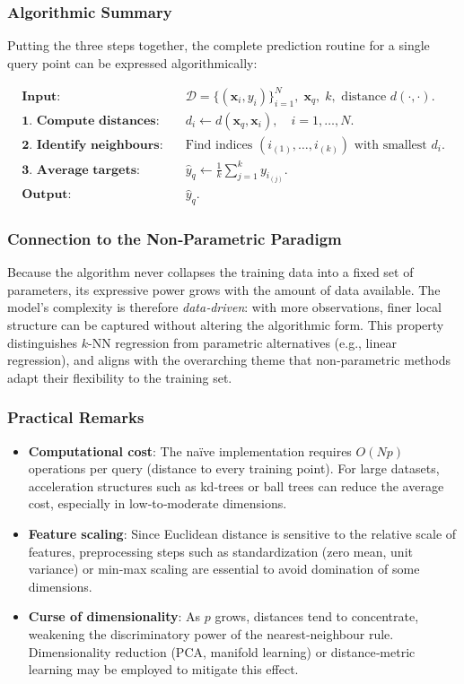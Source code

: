 \documentclass[12pt, a4paper]{article}
\begin{document}
\subsubsection{Algorithmic Summary}
Putting the three steps together, the complete prediction routine for a single query point can be expressed algorithmically:

\[
\begin{aligned}
\textbf{Input:}&\quad \mathcal{D}=\{(\mathbf{x}_i,y_i)\}_{i=1}^{N},\; \mathbf{x}_q,\; k, \text{ distance } d(\cdot,\cdot).\\
\textbf{1. Compute distances:}&\quad d_i \leftarrow d(\mathbf{x}_q,\mathbf{x}_i), \quad i=1,\dots,N.\\
\textbf{2. Identify neighbours:}&\quad \text{Find indices } (i_{(1)},\dots,i_{(k)}) \text{ with smallest } d_i.\\
\textbf{3. Average targets:}&\quad \hat{y}_q \leftarrow \frac{1}{k}\sum_{j=1}^{k} y_{i_{(j)}}.\\
\textbf{Output:}&\quad \hat{y}_q.
\end{aligned}
\]

\subsubsection{Connection to the Non‑Parametric Paradigm}
Because the algorithm never collapses the training data into a fixed set of parameters, its expressive power grows with the amount of data available.  The model’s complexity is therefore \emph{data‑driven}: with more observations, finer local structure can be captured without altering the algorithmic form.  This property distinguishes \(k\)-NN regression from parametric alternatives (e.g., linear regression), and aligns with the overarching theme that non‑parametric methods adapt their flexibility to the training set.

\subsubsection{Practical Remarks}
\begin{itemize}
    \item \textbf{Computational cost}: The naïve implementation requires \(O(Np)\) operations per query (distance to every training point).  For large datasets, acceleration structures such as kd‑trees or ball trees can reduce the average cost, especially in low‑to‑moderate dimensions.
    \item \textbf{Feature scaling}: Since Euclidean distance is sensitive to the relative scale of features, preprocessing steps such as standardization (zero mean, unit variance) or min‑max scaling are essential to avoid domination of some dimensions.
    \item \textbf{Curse of dimensionality}: As \(p\) grows, distances tend to concentrate, weakening the discriminatory power of the nearest‑neighbour rule.  Dimensionality reduction (PCA, manifold learning) or distance‑metric learning may be employed to mitigate this effect.
\end{itemize}
\end{document}
